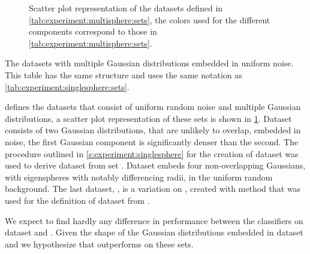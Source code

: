 
\begin{figure}
	\centering
	
	\caption{Scatter plot representation of the datasets defined in \cref{tab:experiment:multisphere:sets}, the colors used for the different components correspond to those in \cref{tab:experiment:multisphere:sets}.}
	\label{fig:experiment:multisphere:sets}
\end{figure}

\begin{table*}
	\centering
	
	\caption{The datasets with multiple Gaussian distributions embedded in uniform noise. This table has the same structure and uses the same notation as \cref{tab:experiment:singlesphere:sets}.} 	
	\label{tab:experiment:multisphere:sets}
\end{table*}

 defines the datasets that consist of uniform random noise and multiple Gaussian distributions, a scatter plot representation of these sets is shown in \cref{fig:experiment:multisphere:sets}. 
	Dataset \ferdosiTwo consists of two Gaussian distributions, that are unlikely to overlap, embedded in noise, the first Gaussian component is significantly denser than the second. 
	The procedure outlined in \cref{s:experiment:singlesphere} for the creation of dataset \baakmanOne was used to derive dataset \baakmanTwo from set \ferdosiTwo.
	Dataset \ferdosiThree embeds four non-overlapping Gaussians, with eigenspheres with notably differencing radii, in the uniform random background. 
	The last dataset, \baakmanThree, is a variation on \ferdosiThree, created with method that was used for the definition of dataset \baakmanOne from \ferdosiOne. 

	We expect to find hardly any difference in performance between the classifiers on dataset \ferdosiTwo and \ferdosiThree. Given the shape of the Gaussian distributions embedded in dataset \baakmanTwo and \baakmanThree we hypothesize that \sambe outperforms \mbe on these sets.